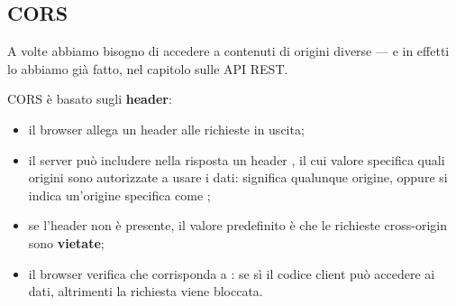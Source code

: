 \subsection{CORS}

A volte abbiamo bisogno di accedere a contenuti di origini diverse --- e in
effetti lo abbiamo già fatto, nel capitolo sulle API REST.


CORS è basato sugli \textbf{header}:

\begin{itemize}
  \item il browser allega un header  alle richieste in uscita;
  \item il server può includere nella risposta un header
        , il cui valore specifica quali
        origini sono autorizzate a usare i dati:
        \code{*} significa qualunque origine, oppure si indica un'origine
        specifica come ;
  \item se l'header non è presente, il valore predefinito è che le richieste
        cross-origin sono \textbf{vietate};
  \item il browser verifica che  corrisponda a
        : se sì il codice client può accedere ai dati, altrimenti
        la richiesta viene bloccata.
\end{itemize}

